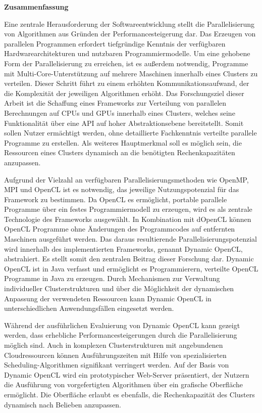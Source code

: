 \thispagestyle{empty}
\begin{center}\textsf{\textbf{Zusammenfassung}}\end{center}

\noindent Eine zentrale Herausforderung der Softwareentwicklung stellt die Parallelisierung von Algorithmen aus Gründen der Performancesteigerung dar. Das Erzeugen von parallelen Programmen erfordert tiefgründige Kenntnis der verfügbaren Hardwarearchitekturen und nutzbaren Programmiermodelle. Um eine gehobene Form der Parallelisierung zu erreichen, ist es außerdem notwendig, Programme mit Multi-Core-Unterstützung auf mehrere Maschinen innerhalb eines Clusters zu verteilen. Dieser Schritt führt zu einem erhöhten Kommunikationsaufwand, der die Komplexität der jeweiligen Algorithmen erhöht. Das Forschungsziel dieser Arbeit ist die Schaffung eines Frameworks zur Verteilung von parallelen Berechnungen auf CPUs und GPUs innerhalb eines Clusters, welches seine Funktionalität über eine API auf hoher Abstraktionsebene bereitstellt. Somit sollen Nutzer ermächtigt werden, ohne detaillierte Fachkenntnis verteilte parallele Programme zu erstellen. Als weiteres Hauptmerkmal soll es möglich sein, die Ressourcen eines Clusters dynamisch an die benötigten Rechenkapazitäten anzupassen.

Aufgrund der Vielzahl an verfügbaren Parallelisierungsmethoden wie OpenMP, MPI und OpenCL ist es notwendig, das jeweilige Nutzungspotenzial für das Framework zu bestimmen. Da OpenCL es ermöglicht, portable parallele Programme über ein festes Programmiermodell zu erzeugen, wird es als zentrale Technologie des Frameworks ausgewählt. In Kombination mit dOpenCL können OpenCL Programme ohne Änderungen des Programmcodes auf entfernten Maschinen ausgeführt werden. Das daraus resultierende Parallelisierungspotenzial wird innerhalb des implementierten Frameworks, genannt Dynamic OpenCL, abstrahiert. Es stellt somit den zentralen Beitrag dieser Forschung dar. Dynamic OpenCL ist in Java verfasst und ermöglicht es Programmierern, verteilte OpenCL Programme in Java zu erzeugen. Durch Mechanismen zur Verwaltung individueller Clusterstrukturen und über die Möglichkeit der dynamischen Anpassung der verwendeten Ressourcen kann Dynamic OpenCL in unterschiedlichen Anwendungsfällen eingesetzt werden.

Während der ausführlichen Evaluierung von Dynamic OpenCL kann gezeigt werden, dass erhebliche Performancesteigerungen durch die Parallelisierung möglich sind. Auch in komplexen Clusterstrukturen mit angebundenen Cloudressourcen können Ausführungszeiten mit Hilfe von spezialisierten Scheduling-Algorithmen signifikant verringert werden. Auf der Basis von Dynamic OpenCL wird ein prototypischer Web-Server präsentiert, der Nutzern die Ausführung von vorgefertigten Algorithmen über ein grafische Oberfläche ermöglicht. Die Oberfläche erlaubt es ebenfalls, die Rechenkapazität des Clusters dynamisch nach Belieben anzupassen.

